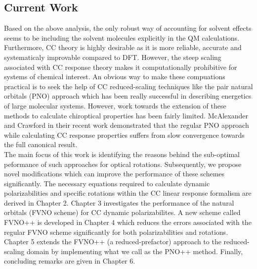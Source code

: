 \subsection{Current Work}
Based on the above analysis, the only robust way of accounting for solvent effects seems to be including the solvent molecules explicitly 
in the QM calculations. Furthermore, CC theory is highly desirable as it is more reliable, accurate and systematicaly improvable compared to DFT.
However, the steep scaling associated with CC response theory makes it computationally prohibitive for systems of chemical interest. 
An obvious way to make these compuations practical is to seek the help of CC reduced-scaling 
techniques like the pair natural orbitals (PNO) approach\cite{NeeseCCSD09,Neese09} which has been really successful in describing energetics of 
large molecular systems. However, work towards the extension of these methods to calculate chiroptical properties has been 
fairly limited\cite{Friedrich15,Gauss00,Korona04,McAlexander12,Russ04,Russ08}. McAlexander and Crawford in their recent 
work\cite{McAlexander15:LRCC} demonstrated that the regular PNO approach while calculating CC response properties 
suffers from slow convergence towards the full canonical result. \\
The main focus of this work is identifying the 
reasons behind the sub-optimal peformance of such approaches for optical rotations. Subsequently, we propose novel modifications
which can improve the performance of these schemes significantly. The necessary equations required to calculate dynamic polarizabilities 
and specific rotations within the CC linear response formalism are derived in Chapter 2. 
Chapter 3 investigates the performance of the natural orbitals (FVNO scheme) for CC dynamic polarizabilites.
A new scheme called FVNO++ is developed in Chapter 4 which reduces the errors associated with the regular FVNO scheme
significantly for both polarizabilities and rotations. Chapter 5 extends the FVNO++ (a reduced-prefactor) approach to the reduced-scaling 
domain by implementing what we call as the PNO++ method. Finally, concluding remarks are given in Chapter 6.
